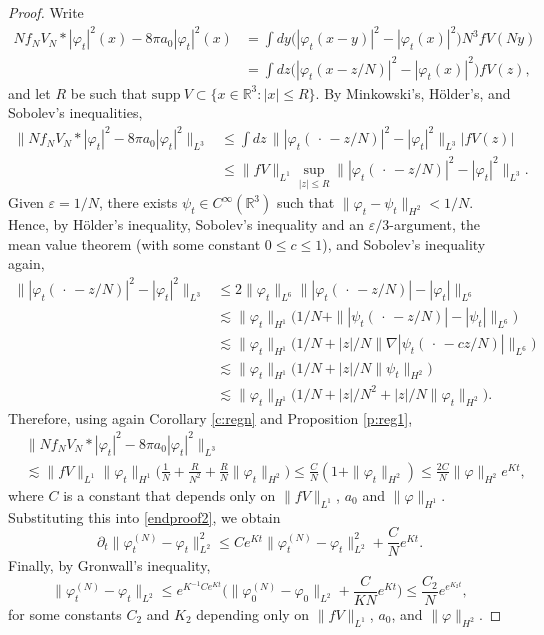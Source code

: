 \documentclass[11pt,a4paper,draft,DIV11]{scrartcl}	%
\newcommand{\R}{\mathds{R}}
\begin{document}
\begin{proof}
  Write
  \begin{align*}
    N f_N V_N * |\varphi_t|^2(x) - 8 \pi a_0 |\varphi_t|^2(x) & = \int dy
    \big( |\varphi_t(x-y)|^2 - |\varphi_t(x)|^2 \big) N^3 fV(Ny) \\
    & = \int dz \big( |\varphi_t(x-z/N)|^2 - |\varphi_t(x)|^2 \big) fV(z),
  \end{align*}
  and let $R$ be such that $\text{supp} \ V \subset \{ x \in \R^3 : |x| \le R \}$.
  By Minkowski's, H\"older's, and Sobolev's inequalities,
  \begin{align*}
    \| N f_N V_N * |\varphi_t|^2 - 8 \pi a_0 |\varphi_t|^2 \|_{L^3} & \le \int
    dz \, \| |\varphi_t(\, \cdot \, -z/N)|^2 - |\varphi_t|^2 \|_{L^3} |fV(z)|
    \\
    & \le \| fV \|_{L^1} \sup_{|z| \le R} \| |\varphi_t(\, \cdot \, - z/N)|^2
    - |\varphi_t|^2 \|_{L^3}.
  \end{align*}
  Given $\varepsilon = 1/N$, there exists $\psi_t \in C^\infty(\R^3)$ such
  that $\| \varphi_t - \psi_t \|_{H^2} < 1/N$. Hence, by H\"older's
  inequality, Sobolev's inequality and an $\varepsilon/3$-argument, the mean
  value theorem (with some constant $0 \le c \le 1$), and Sobolev's inequality
  again,
  \begin{align*}
    \| |\varphi_t(\, \cdot \, - z/N)|^2 - |\varphi_t|^2 \|_{L^3} & \le 2 \|
    \varphi_t \|_{L^6} \| |\varphi_t(\, \cdot \, - z/N)| - |\varphi_t|
    \|_{L^6} \\
    & \apprle \| \varphi_t \|_{H^1} \big( 1/N + \| |\psi_t(\, \cdot \, - z/N)|
    - |\psi_t| \|_{L^6} \big) \\
    & \apprle \| \varphi_t \|_{H^1} \big( 1/N + |z|/N \| \nabla |\psi_t(\,
    \cdot \, - c z/N)| \|_{L^6} \big) \\
    & \apprle \| \varphi_t \|_{H^1} \big( 1/N + |z|/N \| \psi_t \|_{H^2}
    \big) \\
    & \apprle \| \varphi_t \|_{H^1} \big( 1/N + |z|/N^2 + |z|/N \| \varphi_t
    \|_{H^2} \big).
  \end{align*}
  Therefore, using again Corollary \ref{c:regn} and Proposition \ref{p:reg1},
  \begin{align*}
    & \| N f_N V_N * |\varphi_t|^2 - 8 \pi a_0 |\varphi_t|^2 \|_{L^3} \\
    & \apprle \| fV \|_{L^1} \| \varphi_t \|_{H^1} \Big( \frac{1}{N} +
    \frac{R}{N^2} + \frac{R}{N} \| \varphi_t \|_{H^2} \Big) \le
    \frac{C}{N}(1 + \| \varphi_t \|_{H^2}) \le \frac{2C}{N} \| \varphi
    \|_{H^2} e^{Kt},
  \end{align*}
  where $C$ is a constant that depends only on $\| fV \|_{L^1}$, $a_0$ and $\|
  \varphi \|_{H^1}$. Substituting this into \eqref{endproof2}, we obtain
  \[
    \partial_t \| \varphi_t^{(N)} - \varphi_t \|_{L^2}^2 \le C e^{Kt} \|
    \varphi_t^{(N)} - \varphi_t \|_{L^2}^2 + \frac{C}{N} e^{Kt}.
  \]
  Finally, by Gronwall's inequality,
  \[
    \| \varphi_t^{(N)} - \varphi_t \|_{L^2} \le e^{K^{-1} C e^{Kt}} \Big( \|
    \varphi_0^{(N)} - \varphi_0 \|_{L^2} + \frac{C}{KN} e^{Kt} \Big) \le
    \frac{C_2}{N} e^{e^{K_2 t}},
  \]
  for some constants $C_2$ and $K_2$ depending only on $\| fV \|_{L^1}$,
  $a_0$, and $\| \varphi \|_{H^2}$.
\end{proof}
\end{document}

